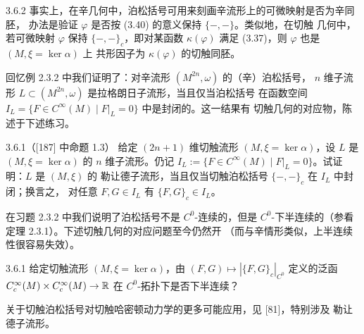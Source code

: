 
\begin{wrem}{3.6.2}
事实上，在辛几何中，泊松括号可用来刻画辛流形上的可微映射是否为辛同胚，
办法是验证 $\varphi$ 是否按 (3.40) 的意义保持 $\{-,-\}$。类似地，在切触
几何中，若可微映射 $\varphi$ 保持 $\{-,-\}_{c}$，即对某函数
$\kappa(\varphi)$ 满足 (3.37)，则 $\varphi$ 也是 $(M,\xi=\ker\alpha)$ 上
共形因子为 $\kappa(\varphi)$ 的切触同胚。
\end{wrem}

回忆例 2.3.2 中我们证明了：对辛流形 $(M^{2n},\omega)$ 的（辛）泊松括号，
$n$ 维子流形 $L\subset(M^{2n},\omega)$ 是拉格朗日子流形，当且仅当泊松括号
在函数空间 $I_L=\{F\in C^\infty(M)\mid F|_L=0\}$ 中是封闭的。这一结果有
切触几何的对应物，陈述于下述练习。

\begin{wexer}{3.6.1}（[187] 中命题 1.3）
给定 $(2n+1)$ 维切触流形 $(M,\xi=\ker\alpha)$，设 $L$ 是
$(M,\xi=\ker\alpha)$ 的 $n$ 维子流形。仍记
$I_L:=\{F\in C^\infty(M)\mid F|_L=0\}$。试证明：$L$ 是 $(M,\xi)$ 的
勒让德子流形，当且仅当切触泊松括号 $\{-,-\}_{c}$ 在 $I_L$ 中封闭；换言之，
对任意 $F,G\in I_L$ 有 $\{F,G\}_{c}\in I_L$。
\end{wexer}

在习题 2.3.2 中我们说明了泊松括号不是 $C^0$-连续的，但是
$C^0$-下半连续的（参看定理 2.3.1）。下述切触几何的对应问题至今仍然开
（而与辛情形类似，上半连续性很容易失效）。

\begin{wque}{3.6.1}
给定切触流形 $(M,\xi=\ker\alpha)$，由
$(F,G)\mapsto|\{F,G\}_{c}|_{C^0}$ 定义的泛函
$C^\infty_c(M)\times C^\infty_c(M)\to\mathbb{R}$ 在 $C^0$-拓扑下是否下半连续？
\end{wque}

关于切触泊松括号对切触哈密顿动力学的更多可能应用，见 [81]，特别涉及
勒让德子流形。
